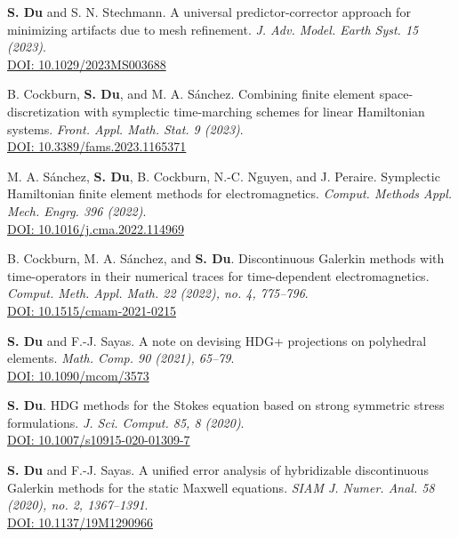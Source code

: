 \documentclass[11pt]{res}
\newenvironment{cvenumerate}{\begin{etaremune}\itemsep -2pt}{\end{etaremune}\vspace{-5pt}}
\begin{document}
\begin{resume}
\begin{cvenumerate}
\item
{\bf S. Du} and S. N. Stechmann. A universal predictor-corrector approach for minimizing artifacts due to mesh refinement. {\sl J. Adv. Model. Earth Syst. 15 (2023)}.\\
\href{https://doi.org/10.1029/2023MS003688}{DOI: 10.1029/2023MS003688}

\item
B. Cockburn, {\bf S. Du}, and M. A. Sánchez. Combining finite element space-discretization with symplectic time-marching schemes for linear Hamiltonian systems.
{\sl Front. Appl. Math. Stat. 9 (2023)}.\\
\href{https://doi.org/10.3389/fams.2023.1165371}{DOI: 10.3389/fams.2023.1165371}


\item M. A. S\'{a}nchez, {\bf S. Du}, B. Cockburn, N.-C. Nguyen, and J. Peraire. Symplectic Hamiltonian finite element methods for electromagnetics. {\sl Comput. Methods Appl. Mech. Engrg. 396 (2022)}.\\
\href{https://doi.org/10.1016/j.cma.2022.114969}{DOI: 10.1016/j.cma.2022.114969}

\item B. Cockburn, M. A. S\'{a}nchez, and {\bf S. Du}. Discontinuous Galerkin methods with time-operators in their numerical traces for time-dependent electromagnetics. {\sl Comput. Meth. Appl. Math. 22 (2022), no. 4, 775--796}.\\
\href{https://doi.org/10.1515/cmam-2021-0215}{DOI: 10.1515/cmam-2021-0215}


\item
{\bf S. Du} and F.-J. Sayas. A note on devising HDG+ projections on polyhedral elements. {\sl Math. Comp. 90 (2021), 65--79}.\\
\href{https://doi.org/10.1090/mcom/3573}{DOI: 10.1090/mcom/3573}


\item 
{\bf S. Du}. HDG methods for the Stokes equation based on strong symmetric stress formulations. {\sl J. Sci. Comput. 85, 8 (2020)}.\\
\href{https://doi.org/10.1007/s10915-020-01309-7}{DOI: 10.1007/s10915-020-01309-7}

\item
{\bf S. Du} and F.-J. Sayas. A unified error analysis of hybridizable discontinuous Galerkin methods for the static Maxwell equations. {\sl SIAM J. Numer. Anal. 58 (2020), no. 2, 1367--1391}.\\
\href{https://doi.org/10.1137/19M1290966}{DOI: 10.1137/19M1290966}


\end{cvenumerate}
\end{resume}
\end{document}
